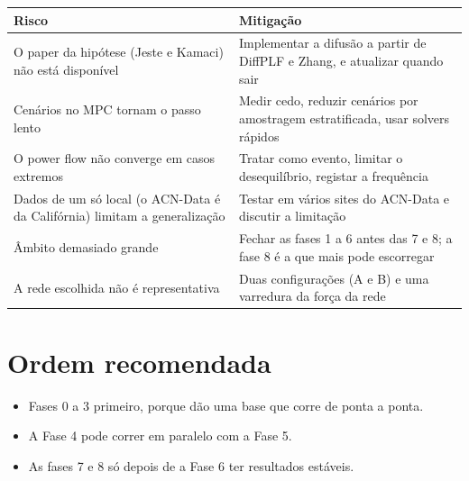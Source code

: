 \documentclass[11pt,a4paper]{article}
\begin{document}
\begin{center}
\small\renewcommand{\arraystretch}{1.3}
\begin{longtable}{@{}P{6.2cm}P{9.2cm}@{}}
\toprule
Risco & Mitigação \\
\midrule
\endhead
O paper da hipótese (Jeste e Kamaci) não está disponível & Implementar a difusão a partir de DiffPLF e Zhang, e atualizar quando sair \\
Cenários no MPC tornam o passo lento & Medir cedo, reduzir cenários por amostragem estratificada, usar solvers rápidos \\
O power flow não converge em casos extremos & Tratar como evento, limitar o desequilíbrio, registar a frequência \\
Dados de um só local (o ACN-Data é da Califórnia) limitam a generalização & Testar em vários sites do ACN-Data e discutir a limitação \\
Âmbito demasiado grande & Fechar as fases 1 a 6 antes das 7 e 8; a fase 8 é a que mais pode escorregar \\
A rede escolhida não é representativa & Duas configurações (A e B) e uma varredura da força da rede \\
\bottomrule
\end{longtable}
\end{center}

\section{Ordem recomendada}

\begin{itemize}
  \item Fases 0 a 3 primeiro, porque dão uma base que corre de ponta a ponta.
  \item A Fase 4 pode correr em paralelo com a Fase 5.
  \item As fases 7 e 8 só depois de a Fase 6 ter resultados estáveis.
\end{itemize}
\end{document}
